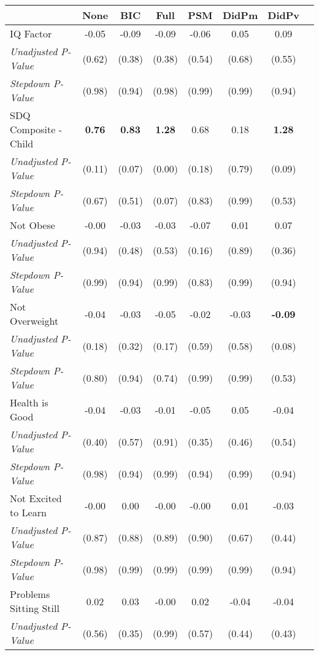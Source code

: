 \begin{tabular}{l c c c c c c c}
\toprule
 & None & BIC & Full & PSM & DidPm & DidPv \\
\midrule
IQ Factor & -0.05 & -0.09 & -0.09 & -0.06 & 0.05 & 0.09 \\
\quad \textit{Unadjusted P-Value} & (0.62) & (0.38) & (0.38) & (0.54) & (0.68) & (0.55) \\
\quad \textit{Stepdown P-Value} & (0.98) & (0.94) & (0.98) & (0.99) & (0.99) & (0.94) \\
SDQ Composite - Child & \textbf{ 0.76 } & \textbf{ 0.83 } & \textbf{ 1.28 } & 0.68 & 0.18 & \textbf{ 1.28 } \\
\quad \textit{Unadjusted P-Value} & (0.11) & (0.07) & (0.00) & (0.18) & (0.79) & (0.09) \\
\quad \textit{Stepdown P-Value} & (0.67) & (0.51) & (0.07) & (0.83) & (0.99) & (0.53) \\
Not Obese & -0.00 & -0.03 & -0.03 & -0.07 & 0.01 & 0.07 \\
\quad \textit{Unadjusted P-Value} & (0.94) & (0.48) & (0.53) & (0.16) & (0.89) & (0.36) \\
\quad \textit{Stepdown P-Value} & (0.99) & (0.94) & (0.99) & (0.83) & (0.99) & (0.94) \\
Not Overweight & -0.04 & -0.03 & -0.05 & -0.02 & -0.03 & \textbf{ -0.09 } \\
\quad \textit{Unadjusted P-Value} & (0.18) & (0.32) & (0.17) & (0.59) & (0.58) & (0.08) \\
\quad \textit{Stepdown P-Value} & (0.80) & (0.94) & (0.74) & (0.99) & (0.99) & (0.53) \\
Health is Good & -0.04 & -0.03 & -0.01 & -0.05 & 0.05 & -0.04 \\
\quad \textit{Unadjusted P-Value} & (0.40) & (0.57) & (0.91) & (0.35) & (0.46) & (0.54) \\
\quad \textit{Stepdown P-Value} & (0.98) & (0.94) & (0.99) & (0.94) & (0.99) & (0.94) \\
Not Excited to Learn & -0.00 & 0.00 & -0.00 & -0.00 & 0.01 & -0.03 \\
\quad \textit{Unadjusted P-Value} & (0.87) & (0.88) & (0.89) & (0.90) & (0.67) & (0.44) \\
\quad \textit{Stepdown P-Value} & (0.98) & (0.99) & (0.99) & (0.99) & (0.99) & (0.94) \\
Problems Sitting Still & 0.02 & 0.03 & -0.00 & 0.02 & -0.04 & -0.04 \\
\quad \textit{Unadjusted P-Value} & (0.56) & (0.35) & (0.99) & (0.57) & (0.44) & (0.43) \\

\end{tabular}
